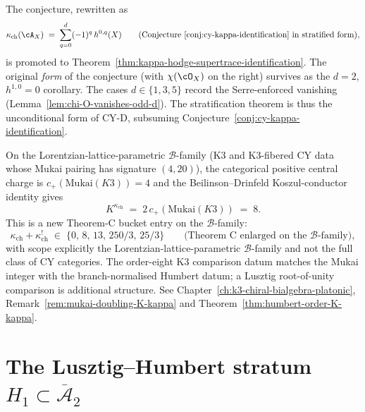 The conjecture, rewritten as
\[
 \kappa_{\mathrm{ch}}(\cA_X) \;=\; \sum_{q = 0}^{d} (-1)^q\, h^{0,q}(X)
 \qquad\text{(Conjecture~\ref{conj:cy-kappa-identification}
 in stratified form)},
\]
is promoted to Theorem~\ref{thm:kappa-hodge-supertrace-identification}.
The original \emph{form} of the conjecture (with $\chi(\cO_X)$ on the
right) survives as the $d = 2$, $h^{1,0} = 0$ corollary. The cases
$d \in \{1, 3, 5\}$ record the Serre-enforced vanishing
(Lemma~\ref{lem:chi-O-vanishes-odd-d}). The stratification theorem is thus the unconditional form of
CY-D, subsuming Conjecture~\ref{conj:cy-kappa-identification}.

\begin{remark}[Mukai-doubling Koszul conductor on the \texorpdfstring{$\mathcal{B}$}{B}-family: \texorpdfstring{$K^{\kappa_{\mathrm{ch}}} = 8$}{K-kappa-ch = 8}]
\label{rem:cy-d-kappa-strat-mukai-doubling}
On the Lorentzian-lattice-parametric $\mathcal{B}$-family (K3 and K3-fibered CY
data whose Mukai pairing has signature $(4,20)$), the categorical positive central
charge is $c_+(\mathrm{Mukai}(K3))=4$ and the Beilinson--Drinfeld Koszul-conductor
identity gives
\[
 K^{\kappa_{\mathrm{ch}}}
 \;=\;
 2\,c_+(\mathrm{Mukai}(K3))
 \;=\;
 8.
\]
This is a new Theorem-C bucket entry on the $\mathcal{B}$-family:
\[
 \kappa_{\mathrm{ch}}+\kappa_{\mathrm{ch}}^!
 \;\in\;
 \{0,\,8,\,13,\,250/3,\,25/3\}
 \qquad\text{(Theorem~C enlarged on the $\mathcal{B}$-family)},
\]
with scope explicitly the Lorentzian-lattice-parametric $\mathcal{B}$-family and not
the full class of CY categories. The order-eight K3 comparison datum
matches the Mukai integer with the branch-normalised Humbert datum; a
Lusztig root-of-unity comparison is additional structure. See
Chapter~\ref{ch:k3-chiral-bialgebra-platonic},
Remark~\ref{rem:mukai-doubling-K-kappa} and
Theorem~\ref{thm:humbert-order-K-kappa}.
\end{remark}

\section{The Lusztig--Humbert stratum \texorpdfstring{$H_1 \subset \overline{\mathcal A}_2$}{H-1 subset overlineA-2}}
\label{sec:cydkappa-lusztig-humbert-H1}

